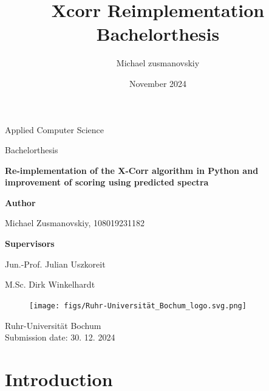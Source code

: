 \documentclass[11pt]{article}
\title{Xcorr Reimplementation Bachelorthesis}
\author{Michael zusmanovskiy}
\date{November 2024}
\begin{document}
\begin{titlepage}
    \begin{center}
        \LARGE
        Applied Computer Science

        \vspace{1cm}
        
        \LARGE
        Bachelorthesis

        \vspace{1cm}
            
        \LARGE
        \textbf{Re-implementation of the X-Corr algorithm in Python and improvement of scoring using predicted spectra}
            
        \vspace{1cm}

        \LARGE
        \textbf{Author}
        
        Michael Zusmanovskiy, 108019231182
        
        \vspace{1cm}
        
        \LARGE
        \textbf{Supervisors}
        
        Jun.-Prof. Julian Uszkoreit
        
        M.Sc. Dirk Winkelhardt
            
        \vfill
        
        \begin{figure}[ht]
            \centering
            \texttt{[image: figs/Ruhr-Universität\_Bochum\_logo.svg.png]}
        \end{figure}
            
        \Large
        Ruhr-Universität Bochum\\
        
        Submission date: 30. 12. 2024
            
    \end{center}
\end{titlepage}


\section{Introduction}
\end{document}
